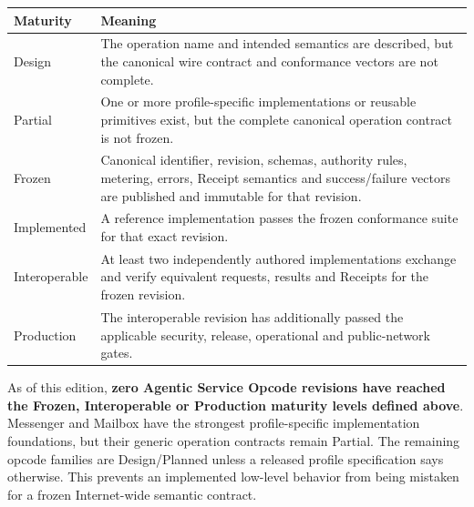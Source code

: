 \documentclass[11pt,oneside]{article}
\begin{document}
\begin{longtable}{L{0.18\textwidth}L{0.71\textwidth}}
\toprule
Maturity & Meaning \\
\midrule
\endhead
Design &
The operation name and intended semantics are described, but the canonical wire contract and
conformance vectors are not complete. \\
Partial &
One or more profile-specific implementations or reusable primitives exist, but the complete
canonical operation contract is not frozen. \\
Frozen &
Canonical identifier, revision, schemas, authority rules, metering, errors, Receipt semantics
and success/failure vectors are published and immutable for that revision. \\
Implemented &
A reference implementation passes the frozen conformance suite for that exact revision. \\
Interoperable &
At least two independently authored implementations exchange and verify equivalent requests,
results and Receipts for the frozen revision. \\
Production &
The interoperable revision has additionally passed the applicable security, release,
operational and public-network gates. \\
\bottomrule
\end{longtable}

As of this edition, \textbf{zero Agentic Service Opcode revisions have reached the Frozen,
Interoperable or Production maturity levels defined above}. Messenger and Mailbox have the
strongest profile-specific implementation foundations, but their generic operation contracts
remain Partial. The remaining opcode families are Design/Planned unless a released profile
specification says otherwise. This prevents an implemented low-level behavior from being
mistaken for a frozen Internet-wide semantic contract.
\end{document}

